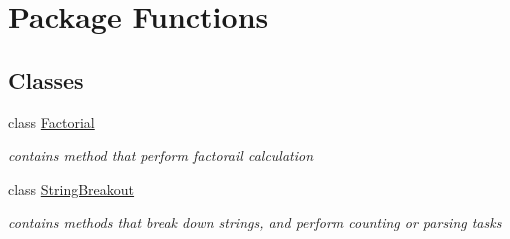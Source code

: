 \hypertarget{namespace_functions}{\section{Package Functions}
\label{namespace_functions}
}
\subsection*{Classes}
\begin{DoxyCompactItemize}
\item 
class \hyperlink{class_functions_1_1_factorial}{Factorial}
\begin{DoxyCompactList}\small\item\em contains method that perform factorail calculation \end{DoxyCompactList}\item 
class \hyperlink{class_functions_1_1_string_breakout}{String\+Breakout}
\begin{DoxyCompactList}\small\item\em contains methods that break down strings, and perform counting or parsing tasks \end{DoxyCompactList}\end{DoxyCompactItemize}
